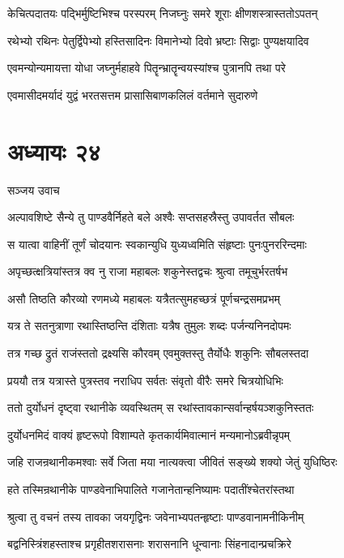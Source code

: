 \twolineshloka
{केचित्पदातयः पद्भिर्मुष्टिभिश्च परस्परम्}
{निजघ्नुः समरे शूराः क्षीणशस्त्रास्ततोऽपतन्}


\twolineshloka
{रथेभ्यो रथिनः पेतुर्द्विपेभ्यो हस्तिसादिनः}
{विमानेभ्यो दिवो भ्रष्टाः सिद्वाः पुण्यक्षयादिव}


\twolineshloka
{एवमन्योन्यमायत्ता योधा जघ्नुर्महाहवे}
{पितॄन्भ्रातॄन्वयस्यांश्च पुत्रानपि तथा परे}


\twolineshloka
{एवमासीदमर्यादं युद्वं भरतसत्तम}
{प्रासासिबाणकलिलं वर्तमाने सुदारुणे}


\chapter{अध्यायः २४}
\twolineshloka
{सञ्जय उवाच}
{}


\twolineshloka
{अल्पावशिष्टे सैन्ये तु पाण्डवैर्निहते बले}
{अश्वैः सप्तसहस्रैस्तु उपावर्तत सौबलः}


\twolineshloka
{स यात्वा वाहिनीं तूर्णं चोदयानः स्वकान्युधि}
{युध्यध्वमिति संहृष्टाः पुनःपुनररिन्दमाः}


\twolineshloka
{अपृच्छत्क्षत्रियांस्तत्र क्व नु राजा महाबलः}
{शकुनेस्तद्वचः श्रुत्वा तमूचुर्भरतर्षभ}


\twolineshloka
{असौ तिष्ठति कौरव्यो रणमध्ये महाबलः}
{यत्रैतत्सुमहच्छत्रं पूर्णचन्द्रसमप्रभम्}


\twolineshloka
{यत्र ते सतनुत्राणा रथास्तिष्ठन्ति दंशिताः}
{यत्रैष तुमुलः शब्दः पर्जन्यनिनदोपमः}


\twolineshloka
{तत्र गच्छ द्रुतं राजंस्ततो द्रक्ष्यसि कौरवम्}
{एवमुक्तस्तु तैर्योधैः शकुनिः सौबलस्तदा}


\twolineshloka
{प्रययौ तत्र यत्रास्ते पुत्रस्तव नराधिप}
{सर्वतः संवृतो वीरैः समरे चित्रयोधिभिः}


\twolineshloka
{ततो दुर्योधनं दृष्ट्वा रथानीके व्यवस्थितम्}
{स रथांस्तावकान्सर्वान्हर्षयञ्शकुनिस्ततः}


\twolineshloka
{दुर्योधनमिदं वाक्यं हृष्टरूपो विशाम्पते}
{कृतकार्यमिवात्मानं मन्यमानोऽब्रवीन्नृपम्}


\twolineshloka
{जहि राजन्रथानीकमश्वाः सर्वे जिता मया}
{नात्यक्त्वा जीवितं सङ्ख्ये शक्यो जेतुं युधिष्ठिरः}


\twolineshloka
{हते तस्मिन्रथानीके पाण्डवेनाभिपालिते}
{गजानेतान्हनिष्यामः पदातींश्चेतरांस्तथा}


\twolineshloka
{श्रुत्वा तु वचनं तस्य तावका जयगृद्विनः}
{जवेनाभ्यपतन्हृष्टाः पाण्डवानामनीकिनीम्}


\twolineshloka
{बद्वनिस्त्रिंशहस्ताश्च प्रगृहीतशरासनाः}
{शरासनानि धून्वानाः सिंहनादान्प्रचक्रिरे}


